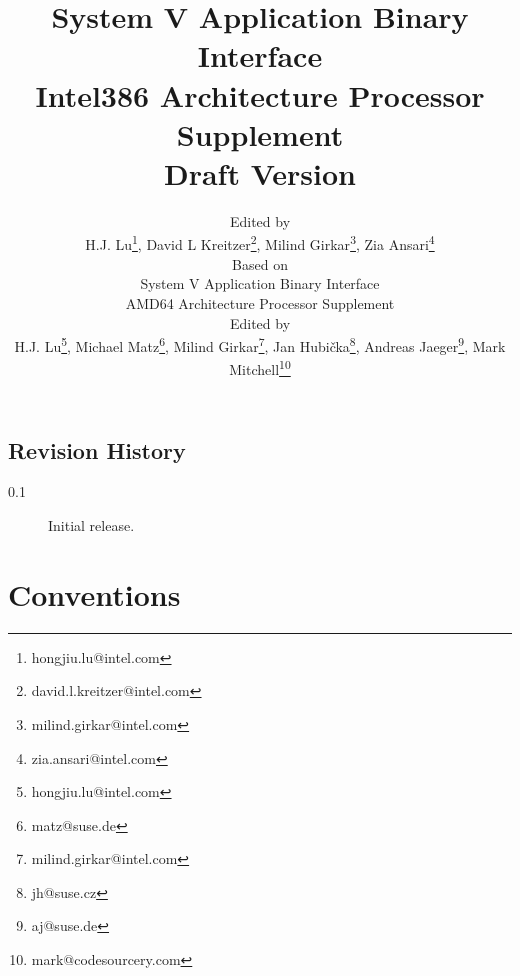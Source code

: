 \documentclass[12pt]{report}
\begin{document}
\author{Edited by\\
  H.J. Lu\thanks{hongjiu.lu@intel.com},
  David L Kreitzer\thanks{david.l.kreitzer@intel.com},
  Milind Girkar\thanks{milind.girkar@intel.com},
  Zia Ansari\thanks{zia.ansari@intel.com} \\
  \small
  Based on\\
  \small
  System V Application Binary Interface\\
  \small
  AMD64 Architecture Processor Supplement\\
  \small
  Edited by\\
  \small
  H.J. Lu\thanks{hongjiu.lu@intel.com},
  Michael Matz\thanks{matz@suse.de},
  Milind Girkar\thanks{milind.girkar@intel.com},
  Jan Hubi\v{c}ka\thanks{jh@suse.cz},
  Andreas Jaeger\thanks{aj@suse.de},
  Mark Mitchell\thanks{mark@codesourcery.com}}

\title{System V Application Binary Interface\\
{\Large Intel386 Architecture Processor Supplement\\
Draft Version \version}}
\maketitle
\tableofcontents
\listoftables
\listoffigures

\section*{Revision History}

\begin{description}

\item[0.1] Initial release.
\end{description}








\chapter{Conventions}



\appendix


\end{document}
